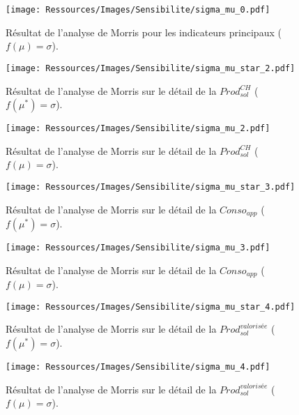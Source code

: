 
\begin{figure}
    \centering
    \texttt{[image: Ressources/Images/Sensibilite/sigma\_mu\_0.pdf]}
    \caption{Résultat de l’analyse de Morris pour les indicateurs principaux
             ($f(\mu) = \sigma$).
             \label{fig:objectifs_mu}}
\end{figure}

\begin{figure}
    \centering
    \texttt{[image: Ressources/Images/Sensibilite/sigma\_mu\_star\_2.pdf]}
    \caption{Résultat de l’analyse de Morris sur le détail de la
             $Prod_{sol}^{CH}$ ($f(\mu^{*}) = \sigma$).
             \label{fig:prod_sol_chauffage_mu_star}}
\end{figure}

\begin{figure}
    \centering
    \texttt{[image: Ressources/Images/Sensibilite/sigma\_mu\_2.pdf]}
    \caption{Résultat de l’analyse de Morris sur le détail de la
             $Prod_{sol}^{CH}$ ($f(\mu) = \sigma$).
             \label{fig:prod_sol_chauffage_mu}}
\end{figure}


\begin{figure}
    \centering
    \texttt{[image: Ressources/Images/Sensibilite/sigma\_mu\_star\_3.pdf]}
    \caption{Résultat de l’analyse de Morris sur le détail de la
             $Conso_{app}$ ($f(\mu^{*}) = \sigma$).
             \label{fig:conso_app_mu_star}}
\end{figure}

\begin{figure}
    \centering
    \texttt{[image: Ressources/Images/Sensibilite/sigma\_mu\_3.pdf]}
    \caption{Résultat de l’analyse de Morris sur le détail de la
             $Conso_{app}$ ($f(\mu) = \sigma$).
             \label{fig:conso_app_mu}}
\end{figure}

\begin{figure}
    \centering
    \texttt{[image: Ressources/Images/Sensibilite/sigma\_mu\_star\_4.pdf]}
    \caption{Résultat de l’analyse de Morris sur le détail de la
             $Prod_{sol}^{valorisée}$ ($f(\mu^{*}) = \sigma$).
             \label{fig:prod_sol_valorisee_mu_star}}
\end{figure}

\begin{figure}
    \centering
    \texttt{[image: Ressources/Images/Sensibilite/sigma\_mu\_4.pdf]}
    \caption{Résultat de l’analyse de Morris sur le détail de la
             $Prod_{sol}^{valorisée}$ ($f(\mu) = \sigma$).
             \label{fig:prod_sol_valorisee_mu}}
\end{figure}
